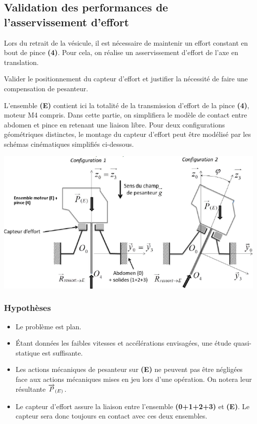 \documentclass[10pt,fleqn]{article} %
\begin{document}
\begin{multicols}{2}
\section*{Validation des performances de l'asservissement d'effort}
Lors du retrait de la vésicule, il est nécessaire de maintenir un effort constant en bout de pince \textbf{(4)}. Pour cela, on réalise un asservissement d'effort de l'axe en translation. 
\begin{obj}
Valider le positionnement du capteur d'effort et justifier la nécessité de faire une compensation de pesanteur. 
\end{obj}

L'ensemble \textbf{(E)} contient ici la totalité de la transmission d’effort de la pince \textbf{(4)}, moteur M4 compris.
Dans cette partie, on simplifiera le modèle de contact entre abdomen et pince en retenant une liaison libre.
Pour deux configurations géométriques distinctes, le montage du capteur d’effort peut être modélisé par les
schémas cinématiques simplifiés ci-dessous.

\begin{center}
\includegraphics[width=\linewidth]{images/fig_07}
\end{center}

\subsubsection*{Hypothèses}
\begin{itemize}
\item Le problème est plan.
\item Étant données les faibles vitesses et accélérations envisagées, une étude quasi-statique est
suffisante.
\item Les actions mécaniques de pesanteur sur \textbf{(E)} ne peuvent pas être négligées face aux actions mécaniques mises en jeu lors d’une opération. On notera leur résultante $\overrightarrow{P}_{(E)}$.
\item Le capteur d’effort assure la liaison entre l’ensemble \textbf{(0+1+2+3)} et \textbf{(E)}. Le capteur sera donc toujours en contact avec ces deux ensembles.
\end{itemize}

\end{multicols}
\end{document}
